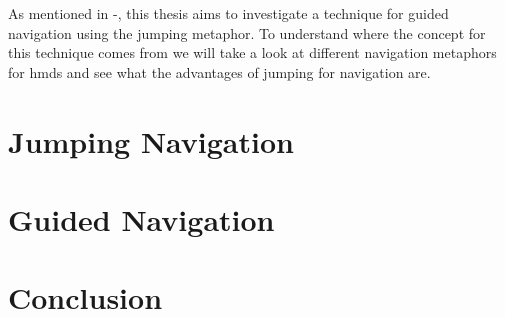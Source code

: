 \label{chapter:Related Work}
As mentioned in -, this thesis aims to investigate a technique for guided navigation using the jumping metaphor. To understand where the concept for this technique comes from we will take a look at different navigation metaphors for \acrfull{hmd}s and see what the advantages of jumping for navigation are. 
\section{Jumping Navigation}
\label{section:RW Jumping Navigation}
\section{Guided Navigation}
\label{section:RW Guided Navigation}
\section{Conclusion}
\label{section:RW Conclusion}
